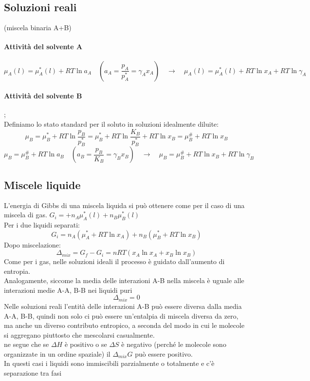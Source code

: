 \documentclass{article}
\newcommand{\so}{\quad \rightarrow \quad}
\begin{document}
\subsection{Soluzioni reali}
(miscela binaria A+B)
\paragraph{Attività del solvente A}
\begin{equation*}
    \mu_A(l)=\mu_A^*(l)+RT\ln a_A \quad \left(a_A=\frac{p_A}{p_A^*}=\gamma_Ax_A \right) \so \mu_A(l)=\mu_A^*(l)+RT\ln x_A+RT\ln \gamma_A
\end{equation*}

\paragraph{Attività del solvente B};\\
Definiamo lo stato standard per il soluto in soluzioni idealmente diluite:
\begin{equation*}
    \mu_B=\mu_B^*+RT\ln\frac{p_B}{p_B^*}=\mu_B^*+RT\ln\frac{K_B}{p_B^*}+RT\ln x_B=\mu_B^\#+RT\ln x_B
\end{equation*}
\begin{equation*}
    \mu_B=\mu_B^\#+RT\ln a_B \quad \left(a_B=\frac{p_B}{K_B}=\gamma_Bx_B \right) \so \mu_B=\mu_B^\#+RT\ln x_B+RT\ln \gamma_B
\end{equation*}

\subsection{Miscele liquide}
L'energia di Gibbs di una miscela liquida si può ottenere come per il caso di una miscela di gas. $G_i=+n_A\mu_A^*(l)+n_B\mu_B^*(l)$\\
Per i due liquidi separati:
\begin{equation*}
    G_i=n_A(\mu_A^*+RT\ln x_A)+n_B(\mu_B^*+RT\ln x_B)
\end{equation*}
Dopo miscelazione:
\begin{equation*}
    \Delta_{mix}=G_f-G_i=nRT(x_A\ln x_A+x_B\ln x_B)
\end{equation*}
Come per i gas, nelle soluzioni ideali il processo è guidato dall'aumento di entropia.\\
Analogamente, siccome la media delle interazioni A-B nella miscela è uguale alle interazioni medie A-A, B-B nei liquidi puri
\begin{equation*}
    \Delta_{mix}=0
\end{equation*}
Nelle soluzioni reali l'entità delle interazioni A-B può essere diversa dalla media A-A, B-B, quindi non solo ci può essere un'entalpia di miscela diversa da zero, ma anche un diverso contributo entropico, a seconda del modo in cui le molecole si aggregano piuttosto che mescolarsi casualmente. \\
ne segue che se $\Delta H$ è positivo o se $\Delta S$ è negativo (perché le molecole sono organizzate in un ordine spaziale) il $\Delta_{mix}G$ può essere positivo.\\
In questi casi i liquidi sono immiscibili parzialmente o totalmente e c'è separazione tra fasi
\end{document}
